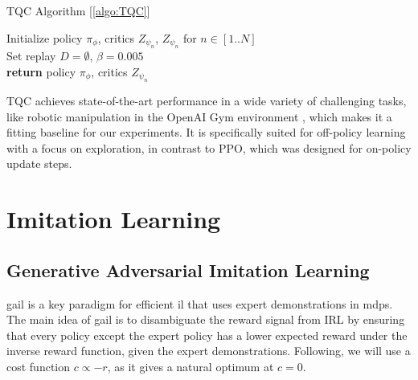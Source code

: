 \begin{algorithm}
    \caption{TQC Algorithm [\ref{algo:TQC}]}
    \label{algo:TQC}
        Initialize policy $\pi_{\phi}$, critics $Z_{\psi_n}$, $Z_{\psi_n}$ for $n \in [1..N]$\\
        Set replay $D = \emptyset$, $\beta = 0.005$\\
        \textbf{return} policy $\pi_{\phi}$, critics $Z_{\psi_n}$
\end{algorithm}
TQC achieves state-of-the-art performance in a wide variety of challenging tasks, like robotic manipulation in the OpenAI Gym environment \cite{1606.01540}, which makes it a fitting baseline 
for our experiments. It is specifically suited 
for off-policy learning with a focus on exploration, in contrast to PPO, which was designed for on-policy update steps.

\section{Imitation Learning}
\subsection{Generative Adversarial Imitation Learning}
\ac{gail} \cite{ho2016generative} is a key paradigm for efficient \ac{il} that uses expert demonstrations in \ac{mdp}s. 
The main idea of \ac{gail} is to disambiguate the reward signal from IRL by ensuring that every policy except the expert policy has a lower expected reward under the inverse reward function, given the expert 
demonstrations. Following, we will use a cost function $c \propto -r$, as it gives a natural optimum at $c=0$.\\

